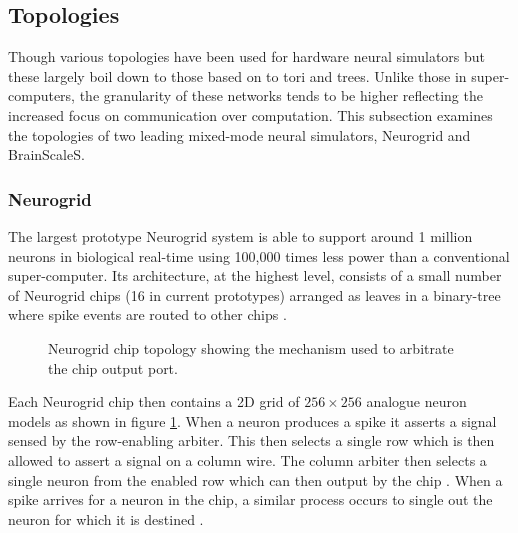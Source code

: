 		\subsection{Topologies}
			
			
			Though various topologies have been used for hardware neural simulators
			but these largely boil down to those based on to tori and trees. Unlike
			those in super-computers, the granularity of these networks tends to be
			higher reflecting the increased focus on communication over computation.
			This subsection examines the topologies of two leading mixed-mode neural
			simulators, Neurogrid and BrainScaleS.
			
			\subsubsection{Neurogrid}
				
				
				The largest prototype Neurogrid system is able to support around 1
				million neurons in biological real-time using 100,000 times less power
				than a conventional super-computer. Its architecture, at the highest
				level, consists of a small number of Neurogrid chips  (16 in current
				prototypes) arranged as leaves in a binary-tree where spike events are
				routed to other chips \cite{choudhary12}.
				
				\begin{figure}
					\center
					
					\caption{Neurogrid chip topology showing the mechanism used to
					arbitrate the chip output port.}
					\label{fig:neurogrid-chip}
				\end{figure}
				
				Each Neurogrid chip then contains a 2D grid of $256\times256$ analogue
				neuron models as shown in figure \ref{fig:neurogrid-chip}. When a neuron
				produces a spike it asserts a signal sensed by the row-enabling arbiter.
				This then selects a single row which is then allowed to assert a signal
				on a column wire. The column arbiter then selects a single neuron from
				the enabled row which can then output by the chip \cite{boahen04}. When
				a spike arrives for a neuron in the chip, a similar process occurs to
				single out the neuron for which it is destined \cite{boahen04receiver}.
				
